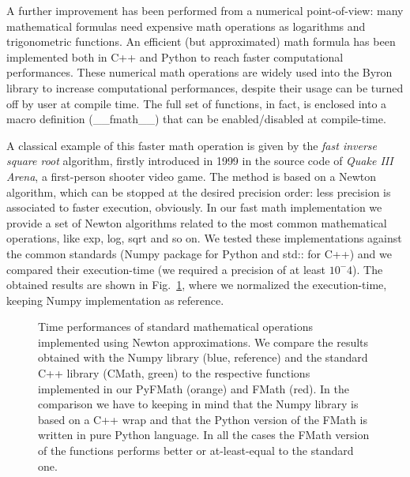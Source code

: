 \documentclass{standalone}
\begin{document}
A further improvement has been performed from a numerical point-of-view: many mathematical formulas need expensive math operations as logarithms and trigonometric functions.
An efficient (but approximated) math formula has been implemented both in \textsf{C++} and \textsf{Python} to reach faster computational performances.
These numerical math operations are widely used into the \textsf{Byron} library to increase computational performances, despite their usage can be turned off by user at compile time.
The full set of functions, in fact, is enclosed into a \textsf{macro} definition (\textsf{\_\_fmath\_\_}) that can be enabled/disabled at compile-time.

A classical example of this faster math operation is given by the \emph{fast inverse square root} algorithm, firstly introduced in 1999 in the source code of \emph{Quake III Arena}, a first-person shooter video game.
The method is based on a Newton algorithm, which can be stopped at the desired precision order: less precision is associated to faster execution, obviously.
In our \textsf{fast math} implementation we provide a set of Newton algorithms related to the most common mathematical operations, like \textsf{exp}, \textsf{log}, \textsf{sqrt} and so on.
We tested these implementations against the common standards (\textsf{Numpy} package for \textsf{Python} and \textsf{std::} for \textsf{C++}) and we compared their execution-time (we required a precision of at least $10^-4$).
The obtained results are shown in Fig.~\ref{fig:fmath}, where we normalized the execution-time, keeping \textsf{Numpy} implementation as reference.

\begin{figure}[htbp]
\centering
\def\svgwidth{0.8\textwidth}

\caption{Time performances of standard mathematical operations implemented using Newton approximations.
We compare the results obtained with the \textsf{Numpy} library (blue, reference) and the standard \textsf{C++} library (\textsf{CMath}, green) to the respective functions implemented in our \textsf{PyFMath} (orange) and \textsf{FMath} (red).
In the comparison we have to keeping in mind that the \textsf{Numpy} library is based on a \textsf{C++} wrap and that the \textsf{Python} version of the \textsf{FMath} is written in pure \textsf{Python} language.
In all the cases the \textsf{FMath} version of the functions performs better or at-least-equal to the standard one.
}
\label{fig:fmath}
\end{figure}
\end{document}
